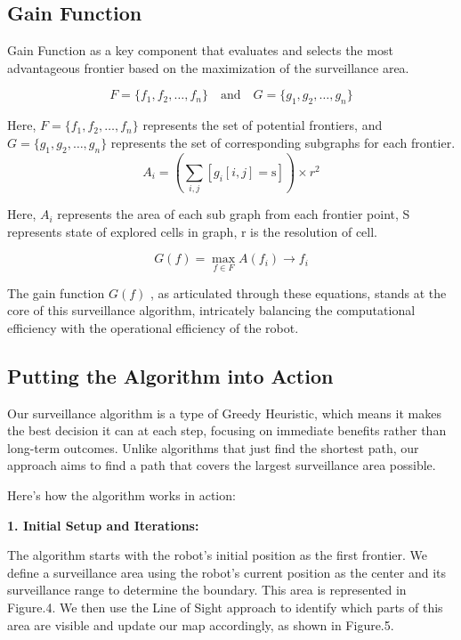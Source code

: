 \subsection{Gain Function}
\label{sec:gain function}
Gain Function as a key component that evaluates and selects the most advantageous frontier based on the maximization of the surveillance area.

\begin{equation}
F = \{f_1, f_2, \ldots, f_n\} \quad \text{and} \quad G = \{g_1, g_2, \ldots, g_n\}
\end{equation}

Here, \( F = \{f_1, f_2, \ldots, f_n\} \) represents the set of potential frontiers, and \( G = \{g_1, g_2, \ldots, g_n\} \) represents the set of corresponding subgraphs for each frontier.
\begin{equation}
A_i = \left( \sum_{i,j} \left[ g_i[i, j] = \text{s} \right] \right) \times r^2
\end{equation}

Here, \(A_i\) represents the area of each sub graph from each frontier point,  S  represents state of explored  cells in graph, r is the resolution of cell.



\begin{equation}
G(f) = \max_{f \in F} A(f_i)\rightarrow f_i 
\end{equation}


The gain function \(G(f)\) , as articulated through these equations, stands at the core of this surveillance algorithm, intricately balancing the computational efficiency with the operational efficiency of the robot.


\subsection{Putting the Algorithm into Action}
\label{sec:Putting_the_Algorithm_into_Action}

Our surveillance algorithm is a type of Greedy Heuristic, which means it makes the best decision it can at each step, focusing on immediate benefits rather than long-term outcomes. Unlike algorithms that just find the shortest path, our approach aims to find a path that covers the largest surveillance area possible.

Here's how the algorithm works in action:

\textbf{1. Initial Setup and Iterations:}

The algorithm starts with the robot’s initial position as the first frontier. We define a surveillance area using the robot's current position as the center and its surveillance range to determine the boundary. This area is represented in Figure.4. We then use the Line of Sight approach to identify which parts of this area are visible and update our map accordingly, as shown in Figure.5.

